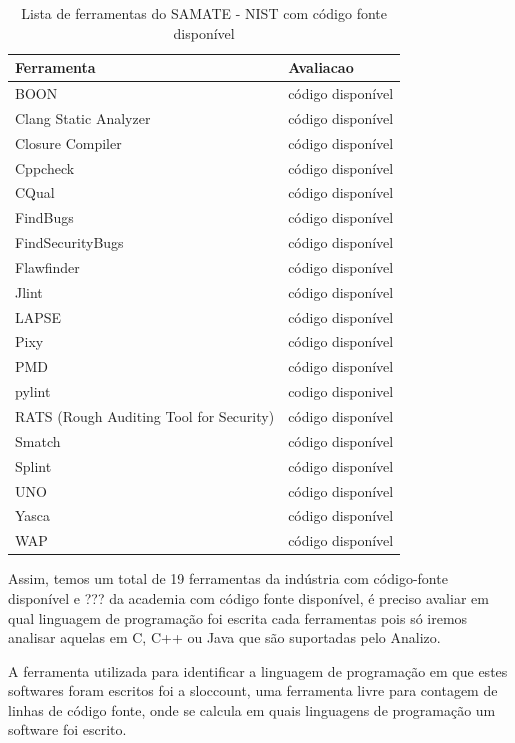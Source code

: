 \documentclass[qual, classic, a4paper]{ufbathesis}
\begin{document}
\begin{table}
\caption{Lista de ferramentas do SAMATE - NIST com código fonte disponível}
\centering
\begin{tabular}{| l | l |}
\hline
Ferramenta & Avaliacao  \\
\hline
BOON                      & código disponível \\
Clang Static Analyzer     & código disponível \\
Closure Compiler          & código disponível \\
Cppcheck                  & código disponível \\
CQual                     & código disponível \\
FindBugs                  & código disponível \\
FindSecurityBugs          & código disponível \\
Flawfinder                & código disponível \\
Jlint                     & código disponível \\
LAPSE                     & código disponível \\
Pixy                      & código disponível \\
PMD                       & código disponível \\
pylint                    & codigo disponivel \\
RATS (Rough Auditing Tool for Security) & código disponível \\
Smatch                    & código disponível \\
Splint                    & código disponível \\
UNO                       & código disponível \\
Yasca                     & código disponível \\
WAP                       & código disponível \\
\hline
\end{tabular}
\label{ferramentas-do-nist-com-codigo}
\end{table}

Assim, temos um total de 19 ferramentas da indústria com código-fonte
disponível e ??? da academia com código fonte disponível, é preciso avaliar em
qual linguagem de programação foi escrita cada ferramentas pois só iremos
analisar aquelas em C, C++ ou Java que são suportadas pelo Analizo.

A ferramenta utilizada para identificar a linguagem de programação em que
estes softwares foram escritos foi a sloccount, uma ferramenta livre para
contagem de linhas de código fonte, onde se calcula em quais linguagens de
programação um software foi escrito.
\end{document}
